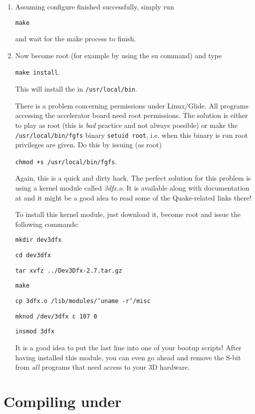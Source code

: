 \begin{enumerate}
\item Assuming configure finished successfully, simply run

        \texttt{make}

 \noindent
and wait for the make process to finish.


\item Now become root (for example by using the su command) and
type

        \texttt{make install}.

 \noindent
This will install the  in \texttt{/usr/local/bin}.

There is a problem concerning permissions under Linux/Glide. All programs accessing the
accelerator board need root permissions. The solution is either to play as root (this is
{\em bad} practice and not always possible) or make the \texttt{/usr/local/bin/fgfs}
binary \texttt{setuid root}, i.e. when this binary is run root privileges are given. Do
this by issuing (as root)

   \texttt{chmod +s /usr/local/bin/fgfs}.

 \noindent

 Again, this is a quick and dirty hack.  The perfect solution for this
 problem is using a kernel module called {\em 3dfx.o}. It is available
 along with documentation at 
 and it might be a good idea to read some of the Quake-related links there!

 To install this kernel module, just download it, become root and
 issue the following commands:

\texttt{mkdir dev3dfx}

\texttt{cd dev3dfx}

\texttt{tar xvfz ../Dev3Dfx-2.7.tar.gz}

\texttt{make}

\texttt{cp 3dfx.o /lib/modules/`uname -r`/misc}

\texttt{mknod /dev/3dfx c 107 0}

\texttt{insmod 3dfx}

It is a good idea to put the last line into one of your bootup scripts! After having
installed this module, you can even go ahead and remove the S-bit from {\em all} programs
that need access to your 3D hardware.


\end{enumerate}

\section{Compiling under }

